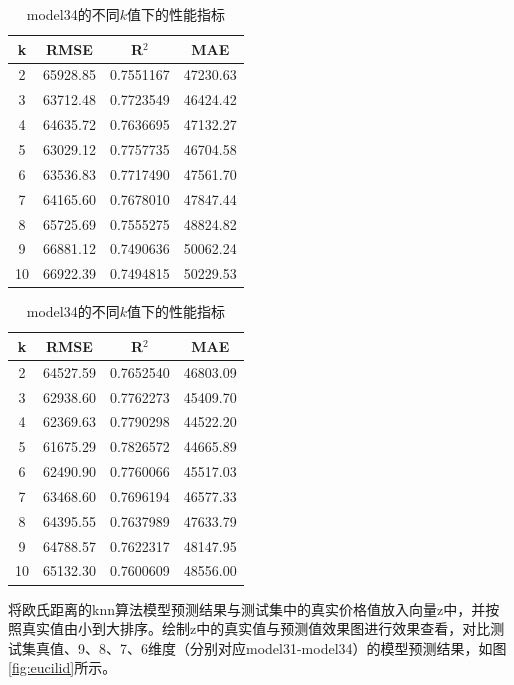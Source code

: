 \documentclass[a4paper,12pt,onecolumn,oneside]{article}
\begin{document}
	\begin{table}
	\begin{subtable}{0.45\textwidth}
		\centering
		\begin{tabular}{cccc}
			\toprule
			k & RMSE & R$^2$ & MAE \\
			\midrule
			2 & 65928.85 & 0.7551167 & 47230.63\\
			3 & 63712.48 & 0.7723549 & 46424.42\\
			4 & 64635.72 & 0.7636695 & 47132.27\\
\rowcolor{gray!25}5 & 63029.12 & 0.7757735 & 46704.58\\
			6 & 63536.83 & 0.7717490 & 47561.70\\
			7 & 64165.60 & 0.7678010 & 47847.44\\
			8 & 65725.69 & 0.7555275 & 48824.82\\
			9 & 66881.12 & 0.7490636 & 50062.24\\
			10 & 66922.39 & 0.7494815 & 50229.53\\
			\bottomrule
		\end{tabular}
		\caption{model33的不同$k$值下的性能指标}
		\label{tbl:model33}
	\end{subtable}
	\hfill
	\begin{subtable}{0.45\textwidth}
		\centering
		\begin{tabular}{cccc}
			\toprule
			k & RMSE & R$^2$ & MAE \\
			\midrule
			2 & 64527.59 & 0.7652540 & 46803.09\\
			3 & 62938.60 & 0.7762273 & 45409.70\\
			4 & 62369.63 & 0.7790298 & 44522.20\\
\rowcolor{gray!25}5 & 61675.29 & 0.7826572 & 44665.89\\
			6 & 62490.90 & 0.7760066 & 45517.03\\
			7 & 63468.60 & 0.7696194 & 46577.33\\
			8 & 64395.55 & 0.7637989 & 47633.79\\
			9 & 64788.57 & 0.7622317 & 48147.95\\
			10 & 65132.30 & 0.7600609 & 48556.00\\
			\bottomrule
		\end{tabular}
		\caption{model34的不同$k$值下的性能指标}
		\label{tbl:model34}
	\end{subtable}
\end{table}
	将欧氏距离的knn算法模型预测结果与测试集中的真实价格值放入向量z中，并按照真实值由小到大排序。绘制z中的真实值与预测值效果图进行效果查看，对比测试集真值、9、8、7、6维度（分别对应model31-model34）的模型预测结果，如图\ref{fig:eucilid}所示。
\end{document}

